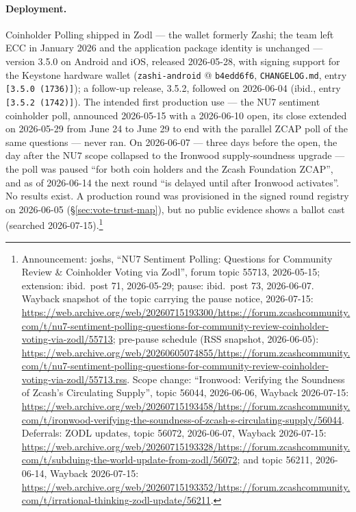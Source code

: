 \documentclass[11pt,a4paper]{article}
\theoremstyle{definition}
\begin{document}
\paragraph{Deployment.} Coinholder Polling shipped in Zodl --- the wallet
formerly Zashi; the team left ECC in January 2026 and the application package
identity is unchanged --- version 3.5.0 on Android and iOS, released
2026-05-28, with signing support for the Keystone hardware wallet
(\texttt{zashi-android} @ \texttt{b4edd6f6}, \texttt{CHANGELOG.md}, entry
\texttt{[3.5.0 (1736)]}); a follow-up release, 3.5.2, followed on 2026-06-04
(ibid., entry \texttt{[3.5.2 (1742)]}). The intended first production use
--- the NU7 sentiment coinholder poll, announced 2026-05-15 with a
2026-06-10 open, its close extended on 2026-05-29 from June 24 to June 29
to end with the parallel ZCAP poll of the same questions --- never ran. On
2026-06-07 --- three days before the open, the day after the NU7 scope
collapsed to the Ironwood supply-soundness upgrade --- the poll was paused
``for both coin holders and the Zcash Foundation ZCAP'', and as of
2026-06-14 the next round ``is delayed until after Ironwood activates''.
No results exist. A production round was provisioned in the signed round
registry on 2026-06-05 (\S\ref{sec:vote-trust-map}), but no public
evidence shows a ballot cast (searched 2026-07-15).\footnote{Announcement:
joshs, ``NU7 Sentiment Polling: Questions for Community Review \&
Coinholder Voting via Zodl'', forum topic 55713, 2026-05-15; extension:
ibid.\ post 71, 2026-05-29; pause: ibid.\ post 73, 2026-06-07. Wayback
snapshot of the topic carrying the pause notice, 2026-07-15:
\url{https://web.archive.org/web/20260715193300/https://forum.zcashcommunity.com/t/nu7-sentiment-polling-questions-for-community-review-coinholder-voting-via-zodl/55713};
pre-pause schedule (RSS snapshot, 2026-06-05):
\url{https://web.archive.org/web/20260605074855/https://forum.zcashcommunity.com/t/nu7-sentiment-polling-questions-for-community-review-coinholder-voting-via-zodl/55713.rss}.
Scope change: ``Ironwood: Verifying the Soundness of Zcash's Circulating
Supply'', topic 56044, 2026-06-06, Wayback 2026-07-15:
\url{https://web.archive.org/web/20260715193458/https://forum.zcashcommunity.com/t/ironwood-verifying-the-soundness-of-zcash-s-circulating-supply/56044}.
Deferrals: ZODL updates, topic 56072, 2026-06-07, Wayback 2026-07-15:
\url{https://web.archive.org/web/20260715193328/https://forum.zcashcommunity.com/t/subduing-the-world-update-from-zodl/56072};
and topic 56211, 2026-06-14, Wayback 2026-07-15:
\url{https://web.archive.org/web/20260715193352/https://forum.zcashcommunity.com/t/irrational-thinking-zodl-update/56211}.}
\end{document}
